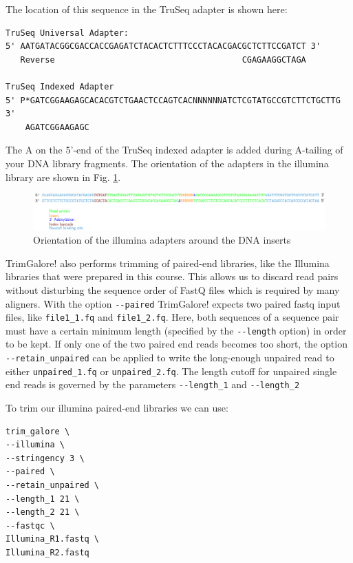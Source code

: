 \documentclass[11pt]{article}
\begin{document}
The location of this sequence in the TruSeq adapter is shown here:

\begin{verbatim}
TruSeq Universal Adapter:
5' AATGATACGGCGACCACCGAGATCTACACTCTTTCCCTACACGACGCTCTTCCGATCT 3'
   Reverse                                      CGAGAAGGCTAGA 

TruSeq Indexed Adapter
5' P*GATCGGAAGAGCACACGTCTGAACTCCAGTCACNNNNNNATCTCGTATGCCGTCTTCTGCTTG 3'
    AGATCGGAAGAGC
\end{verbatim}

The A on the 5'-end of the TruSeq indexed adapter is added during
A-tailing of your DNA library fragments.
The orientation of the adapters in the illumina library are shown in Fig. \ref{fig:orgparagraph4}.
\begin{figure}[htb]
\centering
\includegraphics[width=17cm]{IlluminaAdaptersVisualized.pdf}
\caption{\label{fig:orgparagraph4}
Orientation of the illumina adapters around the DNA inserts}
\end{figure}


TrimGalore! also performs trimming of paired-end libraries, like the
Illumina libraries that were prepared in this course. This allows us to
discard read pairs without disturbing the sequence order of
FastQ files which is required by many aligners.  With the option
\texttt{-{}-paired} TrimGalore! expects two paired fastq input files, like
\texttt{file1\_1.fq} and \texttt{file1\_2.fq}.  Here, both sequences of a sequence
pair must have a certain minimum length (specified by the \texttt{-{}-length}
option) in order to be kept. If only one of the two paired end reads
becomes too short, the option \texttt{-{}-retain\_unpaired} can be applied to
write the long-enough unpaired read to either \texttt{unpaired\_1.fq} or
\texttt{unpaired\_2.fq}. The length cutoff for unpaired single end reads is
governed by the parameters \texttt{-{}-length\_1} and \texttt{-{}-length\_2}

To trim our illumina paired-end libraries we can use:

\begin{verbatim}
trim_galore \
--illumina \
--stringency 3 \
--paired \
--retain_unpaired \
--length_1 21 \
--length_2 21 \
--fastqc \
Illumina_R1.fastq \
Illumina_R2.fastq
\end{verbatim}
\end{document}
